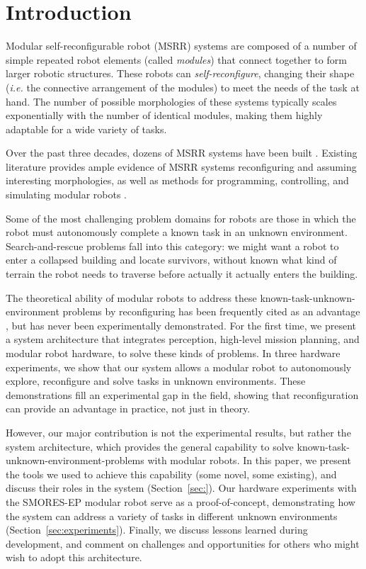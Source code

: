 \documentclass[conference]{IEEEtran}
\begin{document}
\section{Introduction} \label{sec:introduction}
%
Modular self-reconfigurable robot (MSRR) systems are composed of a number of simple repeated robot elements (called \emph{modules}) that connect together to form larger robotic structures. These robots can \emph{self-reconfigure}, changing their shape (\emph{i.e.} the connective arrangement of the modules) to meet the needs of the task at hand.
The number of possible morphologies of these systems typically scales exponentially with the number of identical modules, making them highly adaptable for a wide variety of tasks. 

Over the past three decades, dozens of MSRR systems have been built \cite{Yim2007a}. Existing literature provides ample evidence of MSRR systems reconfiguring and assuming interesting morphologies, as well as methods for programming, controlling, and simulating modular robots \cite{Yim2007,Jing2016,Yim1994}.

Some of the most challenging problem domains for robots are those in which the robot must autonomously complete a known task in an unknown environment.  Search-and-rescue problems fall into this category: we might want a robot to enter a collapsed building and locate survivors, without known what kind of terrain the robot needs to traverse before actually it actually enters the building.

The theoretical ability of modular robots to address these known-task-unknown-environment problems by reconfiguring has been frequently cited as an advantage \cite{Yim2007a}, but has never been experimentally demonstrated.  For the first time, we present a system architecture that integrates perception, high-level mission planning, and modular robot hardware, to solve these kinds of problems. In three hardware experiments, we show that our system allows a modular robot to autonomously explore, reconfigure and solve tasks in unknown environments.  These demonstrations fill an experimental gap in the field, showing that reconfiguration can provide an advantage in practice, not just in theory.

However, our major contribution is not the experimental results, but rather the system architecture, which provides the general capability to solve known-task-unknown-environment-problems with modular robots.  In this paper, we present the tools we used to achieve this capability (some novel, some existing), and discuss their roles in the system (Section~\ref{sec:}).  Our hardware experiments with the SMORES-EP modular robot serve as a proof-of-concept, demonstrating how the system can address a variety of tasks in different unknown environments (Section~\ref{sec:experiments}).  Finally, we discuss lessons learned during development, and comment on challenges and opportunities for others who might wish to adopt this architecture.
\end{document}
